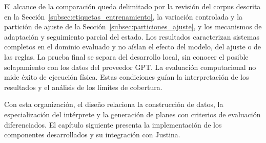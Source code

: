 El alcance de la comparación queda delimitado por la revisión del corpus descrita en la Sección~\ref{subsec:etiquetas_entrenamiento}, la variación controlada y la partición de ajuste de la Sección~\ref{subsec:particiones_ajuste}, y los mecanismos de adaptación y seguimiento parcial del estado. Los resultados caracterizan sistemas completos en el dominio evaluado y no aíslan el efecto del modelo, del ajuste o de las reglas. La prueba final se separa del desarrollo local, sin conocer el posible solapamiento con los datos del proveedor GPT. La evaluación computacional no mide éxito de ejecución física. Estas condiciones guían la interpretación de los resultados y el análisis de los límites de cobertura.

Con esta organización, el diseño relaciona la construcción de datos,
la especialización del intérprete y la generación de planes con
criterios de evaluación diferenciados. El capítulo siguiente presenta
la implementación de los componentes desarrollados y su integración
con Justina.
